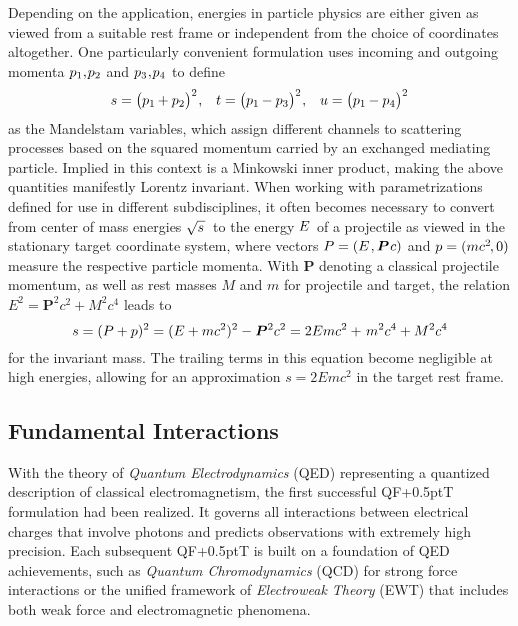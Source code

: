 Depending on the application, energies in particle physics are either given as viewed from a suitable rest frame or independent from
the choice of coordinates altogether. One particularly convenient formulation uses incoming and outgoing momenta
$p_1 , \kern-1.0pt p_2$ and $p_3 \kern+0.5pt , \kern-1.0pt p_4$ to define
\begin{align*}
	s = \bigl( p_1 \kern-0.5pt + p_2 \bigr)^2 \kern+0.5pt , &&
	t = \bigl( p_1 \kern-0.5pt - p_3 \bigr)^2 \kern+0.5pt , &&
	u = \bigl( p_1 \kern-0.5pt - p_4 \bigr)^2
\end{align*}
as the Mandelstam variables, which assign different channels to scattering processes based on the squared momentum carried by an
exchanged mediating particle. Implied in this context is a Minkowski inner product, making the above quantities manifestly Lorentz
invariant.
{\newpage}
When working with parametrizations defined for use in different subdisciplines, it often becomes necessary to convert from center
of mass energies $\sqrt{s \kern+1.0pt} \kern+1.0pt$ to the energy $\kern-0.5pt E \kern+1.0pt$ of a projectile as viewed in the
stationary target coordinate system, where vectors $P = (E \kern+1.0pt , \bm{P} \kern+0.75pt c)$ and $p = (m c^2 \kern-1.0pt , 0)$
measure the respective particle momenta. With $\bm{P}$ denoting a classical projectile momentum, as well as rest masses $M$ and $m$
for projectile and target, the relation $E^2 = \bm{P}^2 c^2 + M^2 c^4$ leads to
\begin{equation*}
	s = (P + p)^2 = (E + m c^2)^2 - \bm{P}^2 c^2 = 2E m c^2 + \kern+1.0pt m^2 c^4 + M^2 c^4
\end{equation*}
for the invariant mass. The trailing terms in this equation become negligible at high energies, allowing for an approximation
$s = 2E m c^2$ in the target rest frame.



\subsection{Fundamental Interactions}
\label{sub:interactions}

With the theory of \emph{Quantum Electrodynamics} (QED) representing a quantized description of classical electromagnetism, the
first successful QF{\kern+0.5pt}T formulation had been realized. It governs all interactions between electrical charges that involve
photons and predicts observations with extremely high precision. Each subsequent QF{\kern+0.5pt}T is built on a foundation of QED
achievements, such as \emph{Quantum Chromodynamics} (QCD) for strong force interactions or the unified framework of
\emph{Electroweak Theory} (EWT) that includes both weak force and electromagnetic phenomena.

